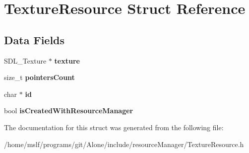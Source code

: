 \hypertarget{struct_texture_resource}{}\section{Texture\+Resource Struct Reference}
\label{struct_texture_resource}
\subsection*{Data Fields}
\begin{DoxyCompactItemize}
\item 
\hypertarget{struct_texture_resource_a859b8efbf9abe8e82757ee5c75a0c97c}{}\label{struct_texture_resource_a859b8efbf9abe8e82757ee5c75a0c97c} 
S\+D\+L\+\_\+\+Texture $\ast$ {\bfseries texture}
\item 
\hypertarget{struct_texture_resource_aa058e87a17f5f5079be31c1631ed5f50}{}\label{struct_texture_resource_aa058e87a17f5f5079be31c1631ed5f50} 
size\+\_\+t {\bfseries pointers\+Count}
\item 
\hypertarget{struct_texture_resource_aecb3b0d045ada529257a2fbf8f829599}{}\label{struct_texture_resource_aecb3b0d045ada529257a2fbf8f829599} 
char $\ast$ {\bfseries id}
\item 
\hypertarget{struct_texture_resource_adcd8ef68b8cee94150537c32674888ce}{}\label{struct_texture_resource_adcd8ef68b8cee94150537c32674888ce} 
bool {\bfseries is\+Created\+With\+Resource\+Manager}
\end{DoxyCompactItemize}


The documentation for this struct was generated from the following file\+:\begin{DoxyCompactItemize}
\item 
/home/mslf/programs/git/\+Alone/include/resource\+Manager/Texture\+Resource.\+h\end{DoxyCompactItemize}
